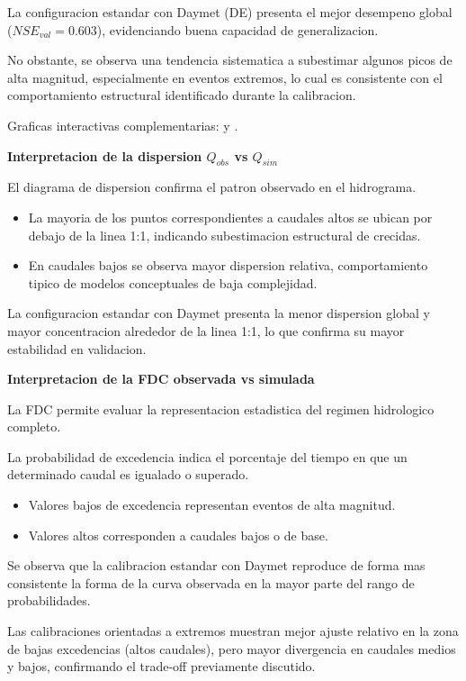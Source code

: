 \documentclass[12pt]{article}
\begin{document}
La configuracion estandar con Daymet (DE) presenta el mejor desempeno global ($NSE_{val}=0.603$), evidenciando buena capacidad de generalizacion.

No obstante, se observa una tendencia sistematica a subestimar algunos picos de alta magnitud, especialmente en eventos extremos, lo cual es consistente con el comportamiento estructural identificado durante la calibracion.

Graficas interactivas complementarias: \texttt{} y \texttt{}.

\textbf{Interpretacion de la dispersion $Q_{obs}$ vs $Q_{sim}$}

El diagrama de dispersion confirma el patron observado en el hidrograma.
\begin{itemize}
\item La mayoria de los puntos correspondientes a caudales altos se ubican por debajo de la linea 1:1, indicando subestimacion estructural de crecidas.
\item En caudales bajos se observa mayor dispersion relativa, comportamiento tipico de modelos conceptuales de baja complejidad.
\end{itemize}
La configuracion estandar con Daymet presenta la menor dispersion global y mayor concentracion alrededor de la linea 1:1, lo que confirma su mayor estabilidad en validacion.

\textbf{Interpretacion de la FDC observada vs simulada}

La FDC permite evaluar la representacion estadistica del regimen hidrologico completo.

La probabilidad de excedencia indica el porcentaje del tiempo en que un determinado caudal es igualado o superado.
\begin{itemize}
\item Valores bajos de excedencia representan eventos de alta magnitud.
\item Valores altos corresponden a caudales bajos o de base.
\end{itemize}

Se observa que la calibracion estandar con Daymet reproduce de forma mas consistente la forma de la curva observada en la mayor parte del rango de probabilidades.

Las calibraciones orientadas a extremos muestran mejor ajuste relativo en la zona de bajas excedencias (altos caudales), pero mayor divergencia en caudales medios y bajos, confirmando el trade-off previamente discutido.
\end{document}
